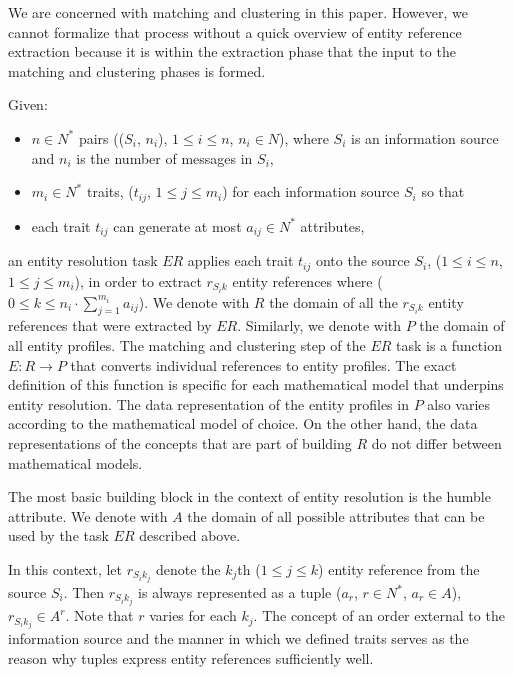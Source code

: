 \documentclass[11pt]{article}
\begin{document}
    We are concerned with matching and clustering in this paper.
    However, we cannot formalize that process without a quick overview of entity
    reference extraction because it is within the extraction phase that the
    input to the matching and clustering phases is formed.

    Given:
    \begin{itemize}
        \item $n \in N^*$ pairs (($S_i$, $n_i$), $1 \leq i \leq n$, $n_i \in N$), 
        where $S_i$ is an information source and $n_i$ is the number of messages
        in $S_i$,
        \item $m_i \in N^*$ traits, ($t_{ij}$, $1 \leq j \leq m_i$) for each
        information source $S_i$ so that
        \item each trait $t_{ij}$ can generate at most $a_{ij} \in N^*$
        attributes,
    \end{itemize}
    an entity resolution task $ER$ applies each trait $t_{ij}$ onto the source
    $S_i$, ($1 \leq i \leq n$, $1 \leq j \leq m_i$), in order to extract
    $r_{{S_i}k}$ entity references where
    ($0 \leq k \leq n_i \cdot \sum^{m_i}_{j=1}a_{ij}$).
    We denote with $R$ the domain of all the $r_{{S_i}k}$ entity references that
    were extracted by $ER$.
    Similarly, we denote with $P$ the domain of all entity profiles.
    The matching and clustering step of the $ER$ task is a function
    $E: R \rightarrow P$ that converts individual references to entity profiles.
    The exact definition of this function is specific for each mathematical
    model that underpins entity resolution.
    The data representation of the entity profiles in $P$ also varies according
    to the mathematical model of choice.
    On the other hand, the data representations of the concepts that are part of
    building $R$ do not differ between mathematical models.

    The most basic building block in the context of entity resolution is the
    humble attribute.
    We denote with $A$ the domain of all possible attributes that can be used by
    the task $ER$ described above.

    In this context, let $r_{{S_i}{k_j}}$ denote the $k_j$th ($1 \leq j \leq k$)
    entity reference from the source $S_i$.
    Then $r_{{S_i}{k_j}}$ is always represented as a tuple
    ($a_r$, $r \in N^*$, $a_r \in A$), $r_{{S_i}{k_j}} \in A^r$.
    Note that $r$ varies for each $k_j$.
    The concept of an order external to the information source and the manner in
    which we defined traits serves as the reason why tuples express entity
    references sufficiently well.
\end{document}
